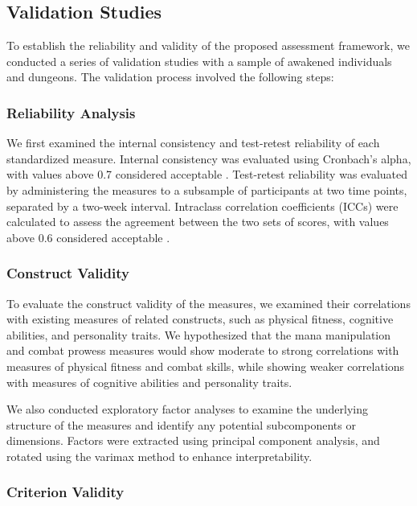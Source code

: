 \documentclass[12pt, a4paper]{article}
\begin{document}
\subsection{Validation Studies}

To establish the reliability and validity of the proposed assessment framework, we conducted a series of validation studies with a sample of awakened individuals and dungeons. The validation process involved the following steps:

\subsubsection{Reliability Analysis}

We first examined the internal consistency and test-retest reliability of each standardized measure. Internal consistency was evaluated using Cronbach's alpha, with values above 0.7 considered acceptable \citep{Nunnally1978}. Test-retest reliability was evaluated by administering the measures to a subsample of participants at two time points, separated by a two-week interval. Intraclass correlation coefficients (ICCs) were calculated to assess the agreement between the two sets of scores, with values above 0.6 considered acceptable \citep{Cicchetti1994}.

\subsubsection{Construct Validity}

To evaluate the construct validity of the measures, we examined their correlations with existing measures of related constructs, such as physical fitness, cognitive abilities, and personality traits. We hypothesized that the mana manipulation and combat prowess measures would show moderate to strong correlations with measures of physical fitness and combat skills, while showing weaker correlations with measures of cognitive abilities and personality traits.

We also conducted exploratory factor analyses to examine the underlying structure of the measures and identify any potential subcomponents or dimensions. Factors were extracted using principal component analysis, and rotated using the varimax method to enhance interpretability.

\subsubsection{Criterion Validity}
\end{document}
